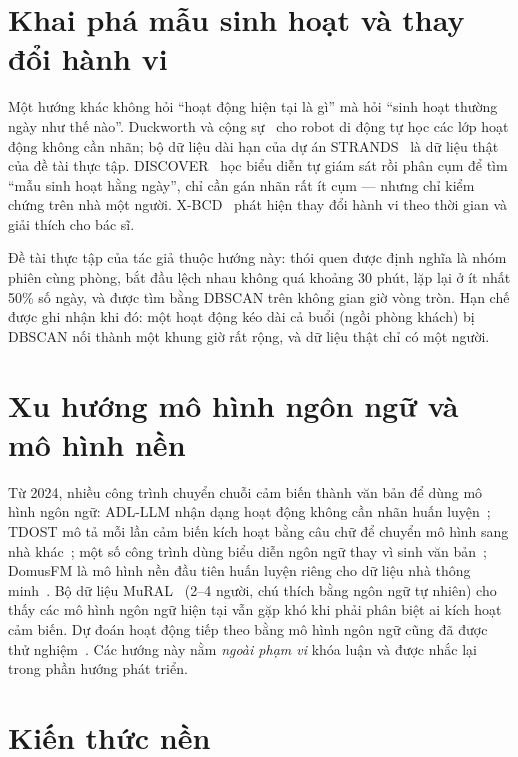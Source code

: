 \section{Khai phá mẫu sinh hoạt và thay đổi hành vi}
\label{sec:bg-routine}

Một hướng khác không hỏi ``hoạt động hiện tại là gì'' mà hỏi ``sinh hoạt thường ngày như thế nào''.
Duckworth và cộng sự~\cite{duckworth2019unsupervised} cho robot di động tự học các lớp hoạt động
không cần nhãn; bộ dữ liệu dài hạn của dự án STRANDS~\cite{coppola2016temporal} là dữ liệu thật của
đề tài thực tập. DISCOVER~\cite{karpekov2025discover} học biểu diễn tự giám sát rồi phân cụm để tìm
``mẫu sinh hoạt hằng ngày'', chỉ cần gán nhãn rất ít cụm --- nhưng chỉ kiểm chứng trên nhà một người.
X-BCD~\cite{civitarese2026xbcd} phát hiện thay đổi hành vi theo thời gian và giải thích cho bác sĩ.

Đề tài thực tập của tác giả thuộc hướng này: thói quen được định nghĩa là nhóm phiên cùng phòng, bắt
đầu lệch nhau không quá khoảng 30 phút, lặp lại ở ít nhất 50\% số ngày, và được tìm bằng DBSCAN
trên không gian giờ vòng tròn. Hạn chế được ghi nhận khi đó: một hoạt động kéo dài cả buổi (ngồi
phòng khách) bị DBSCAN nối thành một khung giờ rất rộng, và dữ liệu thật chỉ có một người.

\section{Xu hướng mô hình ngôn ngữ và mô hình nền}
\label{sec:bg-llm}

Từ 2024, nhiều công trình chuyển chuỗi cảm biến thành văn bản để dùng mô hình ngôn ngữ: ADL-LLM nhận
dạng hoạt động không cần nhãn huấn luyện~\cite{civitarese2024adlllm}; TDOST mô tả mỗi lần cảm biến
kích hoạt bằng câu chữ để chuyển mô hình sang nhà khác~\cite{thukral2024tdost}; một số công trình
dùng biểu diễn ngôn ngữ thay vì sinh văn bản~\cite{dhekane2025prompt}; DomusFM là mô hình nền đầu
tiên huấn luyện riêng cho dữ liệu nhà thông minh~\cite{fiori2026domusfm}. Bộ dữ liệu MuRAL~\cite{chen2025mural}
(2--4 người, chú thích bằng ngôn ngữ tự nhiên) cho thấy các mô hình ngôn ngữ hiện tại vẫn gặp khó
khi phải phân biệt ai kích hoạt cảm biến. Dự đoán hoạt động tiếp theo bằng mô hình ngôn ngữ cũng đã
được thử nghiệm~\cite{doctorarastoo2026prediction}. Các hướng này nằm \emph{ngoài phạm vi} khóa luận
và được nhắc lại trong phần hướng phát triển.

\section{Kiến thức nền}
\label{sec:bg-tools}

